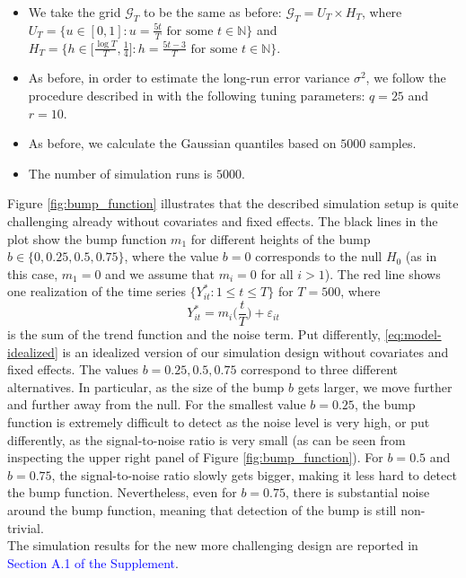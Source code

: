 \documentclass[a4paper,12pt]{article}
\begin{document}
\begin{enumerate}[label=\arabic*.,leftmargin=0.6cm]
\begin{enumerate}[label=(\roman*),leftmargin=0.75cm,topsep=0pt]
\begin{itemize}[leftmargin=0.45cm,itemsep=0pt,topsep=0pt]
\item We take the grid $\mathcal{G}_T$ to be the same as before: $\mathcal{G}_T = U_T \times H_T$, where $U_T = \big\{ u \in [0,1]: u = \textstyle{\frac{5t}{T}} \text{ for some } t \in \mathbb{N} \big\}$ and $H_T = \big\{ h \in \big[ \textstyle{\frac{\log T}{T}}, \textstyle{\frac{1}{4}} \big]:  h = \textstyle{\frac{5t - 3}{T}} \text{ for some } t \in \mathbb{N} \big\}$.

\item As before, in order to estimate the long-run error variance $\sigma^2$, we follow the procedure described in \citet{KhismatullinaVogt2020} with the following tuning parameters: $q = 25$ and $r = 10$.

\item As before, we calculate the Gaussian quantiles based on $5000$ samples. 

\item The number of simulation runs is $5000$. 

\end{itemize}

Figure \ref{fig:bump_function} illustrates that the described simulation setup is quite challenging already without covariates and fixed effects. The black lines in the plot show the bump function $m_1$ for different heights of the bump $b \in \{0, 0.25, 0.5, 0.75\}$, where the value $b=0$ corresponds to the null $H_0$ (as in this case, $m_1 = 0$ and we assume that $m_i = 0$ for all $i > 1$). The red line shows one realization of the time series $\{Y_{it}^*:1 \le t \le T \}$ for $T=500$, where 
\begin{equation}\label{eq:model-idealized}
Y_{it}^* = m_i\Big(\frac{t}{T}\Big) + \varepsilon_{it} 
\end{equation}
is the sum of the trend function and the noise term. Put differently, \eqref{eq:model-idealized} is an idealized version of our simulation design without covariates and fixed effects. The values $b=0.25,0.5,0.75$ correspond to three different alternatives. In particular, as the size of the bump $b$ gets larger, we move further and further away from the null. For the smallest value $b=0.25$, the bump function is extremely difficult to detect as the noise level is very high, or put differently, as the signal-to-noise ratio is very small (as can be seen from inspecting the upper right panel of Figure \ref{fig:bump_function}). For $b=0.5$ and $b=0.75$, the signal-to-noise ratio slowly gets bigger, making it less hard to detect the bump function. Nevertheless, even for $b=0.75$, there is substantial noise around the bump function, meaning that detection of the bump is still non-trivial. \\
The simulation results for the new more challenging design are reported in \textcolor{blue}{Section A.1 of the Supplement}. 


\end{enumerate}
\end{enumerate}
\end{document}
